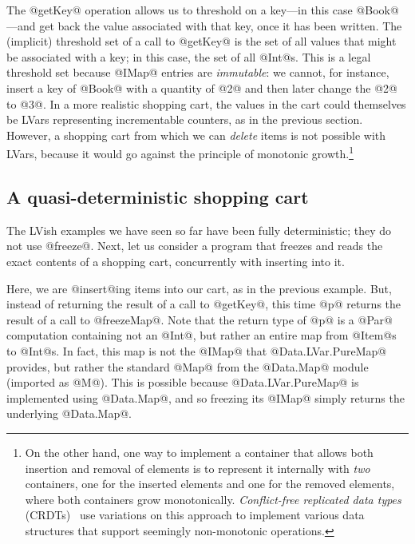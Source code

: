 The @getKey@ operation allows us to threshold on a key---in this case
@Book@---and get back the value associated with that key, once it has
been written.  The (implicit) threshold set of a call to @getKey@ is
the set of all values that might be associated with a key; in this
case, the set of all @Int@s.  This is a legal threshold set because
@IMap@ entries are \emph{immutable}: we cannot, for instance, insert a
key of @Book@ with a quantity of @2@ and then later change the @2@ to
@3@.  In a more realistic shopping cart, the values in the cart could
themselves be LVars representing incrementable counters, as in the
previous section.  
However, a shopping cart from which we can \emph{delete} items is not
possible with LVars, because it would go against the principle of
monotonic growth.\footnote{On the other hand, one way to implement a
  container that allows both insertion and removal of elements is to
  represent it internally with \emph{two} containers, one for the
  inserted elements and one for the removed elements, where both
  containers grow monotonically.  \emph{Conflict-free replicated data
    types} (CRDTs)~\cite{crdts} use variations on this approach to
  implement various data structures that support seemingly
  non-monotonic operations.  }

\subsection{A quasi-deterministic shopping cart}

The LVish examples we have seen so far have been fully deterministic;
they do not use @freeze@.  Next, let us consider a program that
freezes and reads the exact contents of a shopping cart, concurrently
with inserting into it.

\singlespacing

\doublespacing

\noindent Here, we are @insert@ing items into our cart, as in the
previous example.  But, instead of returning the result of a call to
@getKey@, this time @p@ returns the result of a call to @freezeMap@.
Note that the return type of @p@ is a @Par@ computation containing not
an @Int@, but rather an entire map from @Item@s to @Int@s.  In fact,
this map is not the @IMap@ that @Data.LVar.PureMap@ provides, but
rather the standard @Map@ from the @Data.Map@ module (imported as
@M@).  This is possible because @Data.LVar.PureMap@ is implemented
using @Data.Map@, and so freezing its @IMap@ simply returns the
underlying @Data.Map@.

